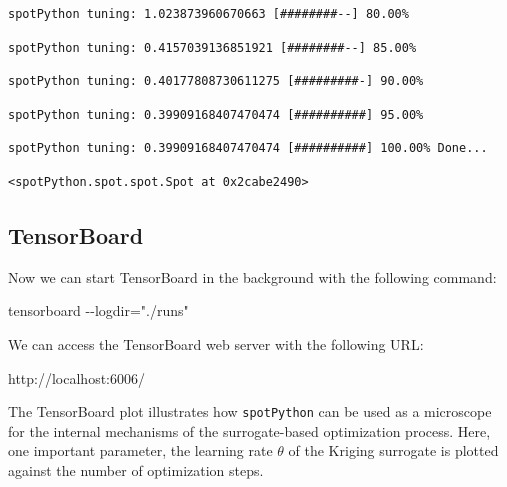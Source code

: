 \documentclass[
  letterpaper,
  DIV=11,
  numbers=noendperiod]{scrreprt}
\newenvironment{Shaded}{\begin{snugshade}}{\end{snugshade}}
\newcommand{\NormalTok}[1]{\textcolor[rgb]{0.00,0.23,0.31}{#1}}
\begin{document}
\begin{verbatim}
spotPython tuning: 1.023873960670663 [########--] 80.00% 
\end{verbatim}

\begin{verbatim}
spotPython tuning: 0.4157039136851921 [########--] 85.00% 
\end{verbatim}

\begin{verbatim}
spotPython tuning: 0.40177808730611275 [#########-] 90.00% 
\end{verbatim}

\begin{verbatim}
spotPython tuning: 0.39909168407470474 [##########] 95.00% 
\end{verbatim}

\begin{verbatim}
spotPython tuning: 0.39909168407470474 [##########] 100.00% Done...
\end{verbatim}

\begin{verbatim}
<spotPython.spot.spot.Spot at 0x2cabe2490>
\end{verbatim}

\hypertarget{tensorboard-7}{%
\subsection{TensorBoard}\label{tensorboard-7}}

Now we can start TensorBoard in the background with the following
command:

\begin{Shaded}
\begin{Highlighting}[]
\NormalTok{tensorboard {-}{-}logdir="./runs"}
\end{Highlighting}
\end{Shaded}

We can access the TensorBoard web server with the following URL:

\begin{Shaded}
\begin{Highlighting}[]
\NormalTok{http://localhost:6006/}
\end{Highlighting}
\end{Shaded}

The TensorBoard plot illustrates how \texttt{spotPython} can be used as
a microscope for the internal mechanisms of the surrogate-based
optimization process. Here, one important parameter, the learning rate
\(\theta\) of the Kriging surrogate is plotted against the number of
optimization steps.
\end{document}

